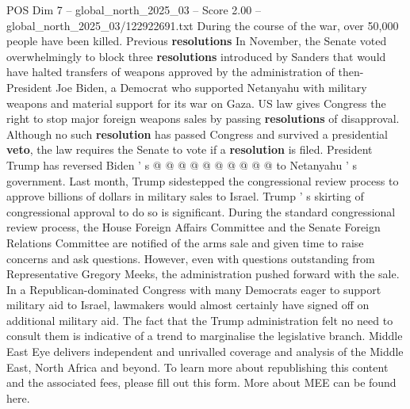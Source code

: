 \begin{textsample}{POS Dim 7 – global\_north\_2025\_03 – Score 2.00 – global\_north\_2025\_03/122922691.txt}
During the course of the war, over 50,000 people have been killed.
Previous \textbf{resolutions} In November, the Senate voted overwhelmingly to block three \textbf{resolutions} introduced by Sanders that would have halted transfers of weapons approved by the administration of then-President Joe Biden, a Democrat who supported Netanyahu with military weapons and material support for its war on Gaza.
US law gives Congress the right to stop major foreign weapons sales by passing \textbf{resolutions} of disapproval.
Although no such \textbf{resolution} has passed Congress and survived a presidential \textbf{veto}, the law requires the Senate to vote if a \textbf{resolution} is filed.
President Trump has reversed Biden ' s @ @ @ @ @ @ @ @ @ @ to Netanyahu ' s government.
Last month, Trump sidestepped the congressional review process to approve billions of dollars in military sales to Israel.
Trump ' s skirting of congressional approval to do so is significant.
During the standard congressional review process, the House Foreign Affairs Committee and the Senate Foreign Relations Committee are notified of the arms sale and given time to raise concerns and ask questions.
However, even with questions outstanding from Representative Gregory Meeks, the administration pushed forward with the sale.
In a Republican-dominated Congress with many Democrats eager to support military aid to Israel, lawmakers would almost certainly have signed off on additional military aid.
The fact that the Trump administration felt no need to consult them is indicative of a trend to marginalise the legislative branch.
Middle East Eye delivers independent and unrivalled coverage and analysis of the Middle East, North Africa and beyond.
To learn more about republishing this content and the associated fees, please fill out this form.
More about MEE can be found here.

\end{textsample}
